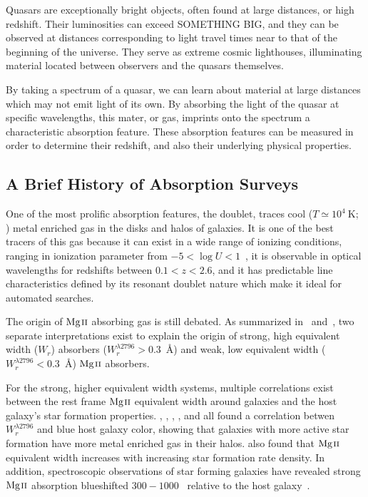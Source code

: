 Quasars are exceptionally bright objects, often found at large distances, or high redshift. Their luminosities can exceed SOMETHING BIG, and they can be observed at distances corresponding to light travel times near to that of the beginning of the universe. They serve as extreme cosmic lighthouses, illuminating material located between observers and the quasars themselves.

By taking a spectrum of a quasar, we can learn about material at large distances which may not emit light of its own. By absorbing the light of the quasar at specific wavelengths, this mater, or gas, imprints onto the spectrum a characteristic absorption feature. These absorption features can be measured in order to determine their redshift, and also their underlying physical properties.

\subsection{A Brief History of {\MgII} Absorption Surveys}
\label{chp1:mgiibackground}

One of the most prolific absorption features, the {\MgIIdblt} doublet, traces cool ($T \simeq 10^4~\mathrm{K}$; \cite{Churchill2003}) metal enriched gas in the disks and halos of galaxies. It is one of the best tracers of this gas because it can exist in a wide range of ionizing conditions, ranging in ionization parameter from $-5 < \log U < 1$~\citep{Churchill1999}, it is observable in optical wavelengths for redshifts between $0.1 < z < 2.6$, and it has predictable line characteristics defined by its resonant doublet nature which make it ideal for automated searches.

The origin of ${\hbox{{\rm Mg}\kern 0.1em{\sc ii}}}$ absorbing gas is still debated. As summarized in~\cite{Kacprzak2011} and~\cite{Matejek2013}, two separate interpretations exist to explain the origin of strong, high equivalent width ($W_r$) {\MgII} absorbers ($W_r^{\lambda2796} > 0.3$~{\AA}) and weak, low equivalent width ($W_r^{\lambda2796} < 0.3$~{\AA}) ${\hbox{{\rm Mg}\kern 0.1em{\sc ii}}}$ absorbers.

For the strong, higher equivalent width systems, multiple correlations exist between the rest frame ${\hbox{{\rm Mg}\kern 0.1em{\sc ii}}}$ equivalent width around galaxies and the host galaxy's star formation properties. \cite{Zibetti2007}, \cite{Lundgren2009}, \cite{Noterdaeme2010}, \cite{Bordoloi2011}, and \cite{Nestor2011} all found a correlation betwen $W_r^{\lambda2796}$ and blue host galaxy color, showing that galaxies with more active star formation have more metal enriched gas in their halos. \cite{Bordoloi2014} also found that ${\hbox{{\rm Mg}\kern 0.1em{\sc ii}}}$ equivalent width increases with increasing star formation rate density. In addition, spectroscopic observations of star forming galaxies have revealed strong ${\hbox{{\rm Mg}\kern 0.1em{\sc ii}}}$ absorption blueshifted $300 - 1000$~{\kms} relative to the host galaxy~\citep{Tremonti2007,Weiner2009,Martin2009,Rubin2010}.

